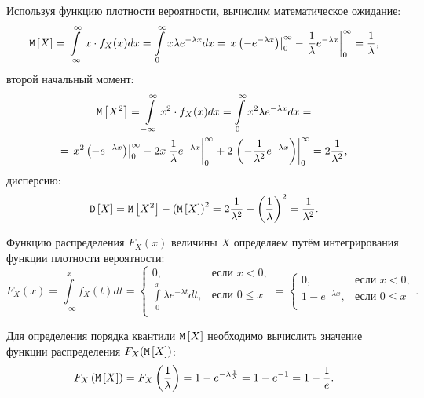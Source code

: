 Используя функцию плотности вероятности, вычислим математическое ожидание:
\begin{equation}
    \mathtt{M} \left [ X \right ]
    = \int \limits_{-\infty}^\infty x \cdot f_X(x) dx
    = \int \limits_0^\infty x \lambda e^{-\lambda x} dx
    = \left . x \left ( - e^{-\lambda x} \right ) \right |_0^\infty
    - \left . \frac{1}{\lambda} e^{-\lambda x} \right |_0^\infty
    = \frac{1}{\lambda} ,
\end{equation}
второй начальный момент:
\begin{multline}
    \mathtt{M} \left [ X^2 \right ]
    = \int \limits_{-\infty}^\infty x^2 \cdot f_X(x) dx
    = \int \limits_0^\infty x^2 \lambda e^{-\lambda x} dx = \\
    = \left . x^2 \left ( - e^{-\lambda x} \right ) \right |_0^\infty
    - 2 x \left . \frac{1}{\lambda} e^{-\lambda x} \right |_0^\infty
    + 2 \left . \left ( - \frac{1}{\lambda^2} e^{-\lambda x} \right ) \right |_0^\infty
    = 2 \frac{1}{\lambda^2} ,
\end{multline}
дисперсию:
\begin{equation}
    \mathtt{D} \left [ X \right ]
    = \mathtt{M} \left [ X^2 \right ] - \left ( \mathtt{M} \left [ X \right ] \right )^2
    = 2 \frac{1}{\lambda^2} - \left ( \frac{1}{\lambda} \right )^2
    = \frac{1}{\lambda^2}.
\end{equation}

Функцию распределения $F_X(x)$ величины $X$ определяем путём интегрирования функции плотности вероятности:
\begin{equation}
    F_X(x)
    = \int \limits_{-\infty}^x f_X(t) dt
    = \left \{
    \begin{array}{ll}
        0,                                            & \text{если } x < 0,  \\
        \int \limits_{0}^x \lambda e^{-\lambda t} dt, & \text{если } 0 \le x \\
    \end{array}
    \right .
    = \left \{
    \begin{array}{ll}
        0,                  & \text{если } x < 0,  \\
        1 - e^{-\lambda x}, & \text{если } 0 \le x \\
    \end{array}
    \right .
    .
\end{equation}

Для определения порядка квантили $\mathtt{M} \left [ X \right ]$ необходимо вычислить значение функции распределения $F_X(\mathtt{M} \left [ X \right ])$:
\begin{equation}
    F_X \left ( \mathtt{M} \left [ X \right ] \right )
    = F_X \left ( \frac{1}{\lambda} \right )
    = 1 - e^{-\lambda \frac{1}{\lambda}}
    = 1 - e^{-1}
    = 1 - \frac{1}{e} .
\end{equation}

